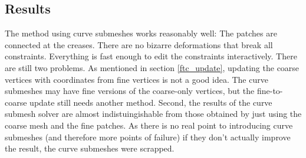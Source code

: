 \documentclass[a4paper,twoside,12pt,nochapterprefix]{scrbook}
\begin{document}
\subsection{Results}
The method using curve submeshes works reasonably well: The patches are connected at the creases. There are no bizarre deformations that break all constraints. Everything is fast enough to edit the constraints interactively. There are still two problems.\newline
As mentioned in section \ref{ftc_update}, updating the coarse vertices with coordinates from fine vertices is not a good idea. The curve submeshes may have fine versions of the coarse-only vertices, but the fine-to-coarse update still needs another method.\newline
Second, the results of the curve submesh solver are almost indistuingishable from those obtained by just using the coarse mesh and the fine patches. As there is no real point to introducing curve submeshes (and therefore more points of failure) if they don't actually improve the result, the curve submeshes were scrapped.\newline
\end{document}
